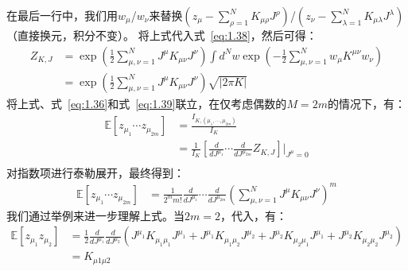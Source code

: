 在最后一行中，我们用$w_\mu$/$w_\nu$来替换$\left(z_\mu - \sum_{\rho=1}^N{K_{\mu\rho}J^{\rho}} \right)$/$\left(z_\nu - \sum_{\lambda=1}^N{K_{\mu\lambda}J^{\lambda}} \right)$ （直接换元，积分不变）。
将上式代入式~\eqref{eq:1.38}，然后可得：
\begin{equation}
    \begin{split}
        Z_{K,J}
        & = 
        \exp \left( \frac{1}{2} \sum_{\mu,\nu=1}^{N} J^{\mu}K_{\mu\nu}J^{\nu} \right)
        \int d^N\!w
        \exp
        \left(
        - \frac{1}{2} \sum_{\mu,\nu=1}^N
        w_\mu
        K^{\mu\nu}
        w_\nu 
        \right) \\
        & =
        \exp \left( \frac{1}{2} \sum_{\mu,\nu=1}^{N} J^{\mu}K_{\mu\nu}J^{\nu} \right)  \sqrt{|2\pi K|}
    \end{split}
\end{equation}
将上式、式~\eqref{eq:1.36}和式~\eqref{eq:1.39}联立，在仅考虑偶数的$M=2m$的情况下，有：
\begin{equation}
    \begin{split}
        \mathbb{E}[z_{\mu_1}\cdots z_{\mu_{2m}}]
        &= \frac{I_{K,(\mu_1,\cdots,\mu_{2m})}}{I_K} \\
        &= \frac{1}{I_K} \left[\frac{d}{dJ^{\mu_1}}\cdots \frac{d}{dJ^{\mu_{2m}}} Z_{K,J} \right] \bigg|_{J^\mu=0} \\
    \end{split}
\end{equation}
对指数项进行泰勒展开，最终得到：
\begin{equation}
    \begin{split}
        \mathbb{E}[z_{\mu_1}\cdots z_{\mu_{2m}}] 
        &=\frac{1}{2^m m!} 
        \frac{d}{dJ^{\mu_1}}\cdots \frac{d}{dJ^{\mu_{2m}}}
        \left(
            \sum_{\mu,\nu=1}^N J^{\mu} K_{\mu\nu} J^{\nu}
        \right)^{m}
    \end{split}
\end{equation}
我们通过举例来进一步理解上式。当$2m=2$，代入，有：
\begin{equation}
    \begin{split}
        \mathbb{E}[z_{\mu_1}z_{\mu_{2}}] 
        &=\frac{1}{2} 
        \frac{d}{dJ^{\mu_1}}\frac{d}{dJ^{\mu_{2}}}
        \left(
            J^{\mu_1} K_{\mu_1\mu_1} J^{\mu_1} +
            J^{\mu_1} K_{\mu_1\mu_2} J^{\mu_2} +
            J^{\mu_2} K_{\mu_2\mu_1} J^{\mu_1} +
            J^{\mu_2} K_{\mu_2\mu_2} J^{\mu_2}
        \right) \\ 
        &= K_{\mu1\mu2}
    \end{split}
\end{equation}
